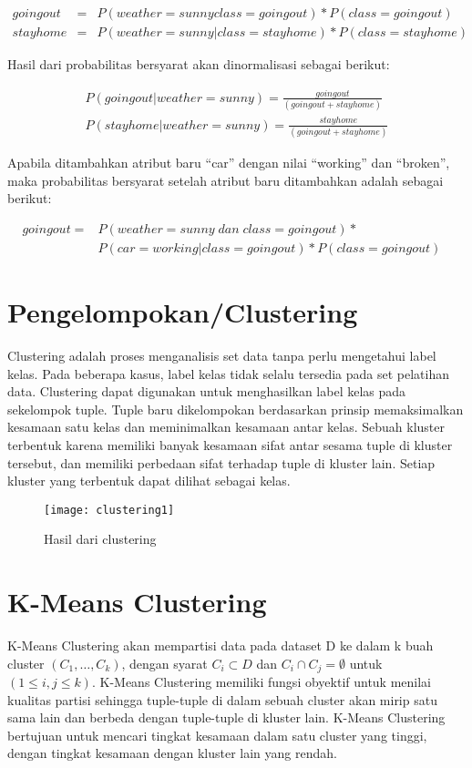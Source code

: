 \begin{enumerate}
\begin{eqnarray*}
goingout &=& P(weather=sunny class=goingout)*P(class=goingout)\\
stayhome &=& P(weather=sunny|class=stayhome)*P(class=stayhome)
\end{eqnarray*}

\noindent Hasil dari probabilitas bersyarat akan dinormalisasi sebagai berikut:

\begin{eqnarray*}
P(goingout|weather=sunny) = \frac{goingout}{(goingout+stayhome)} \\
P(stayhome|weather=sunny) = \frac{stayhome}{(goingout+stayhome)}
\end{eqnarray*}

\noindent Apabila ditambahkan atribut baru “car” dengan nilai “working” dan “broken”, maka probabilitas bersyarat setelah atribut baru ditambahkan adalah sebagai berikut: 

\begin{eqnarray*}
goingout = &P(weather=sunny \; dan \; class=goingout)*&\\
&P(car=working|class=goingout)*P(class=goingout)&
\end{eqnarray*}

\end{enumerate}

\newpage
\section{Pengelompokan/Clustering} 
Clustering adalah proses menganalisis set data tanpa perlu mengetahui label kelas. Pada beberapa kasus, label kelas tidak selalu tersedia pada set pelatihan data. Clustering dapat digunakan untuk menghasilkan label kelas pada sekelompok tuple. Tuple baru dikelompokan berdasarkan prinsip memaksimalkan kesamaan satu kelas dan meminimalkan kesamaan antar kelas. Sebuah kluster terbentuk karena memiliki banyak kesamaan sifat antar sesama tuple di kluster tersebut, dan memiliki perbedaan sifat terhadap tuple di kluster lain. Setiap kluster yang terbentuk dapat dilihat sebagai kelas.

\begin{figure}[H]
	\centering
	\texttt{[image: clustering1]}
	\caption{Hasil dari clustering}
	\label{fig:rnaalgorithm}
\end{figure}

\section{K-Means Clustering} 
K-Means Clustering akan mempartisi data pada dataset D ke dalam k buah cluster 
$(C_1, \ldots, C_k)$, dengan syarat $C_i \subset D$ dan $C_i \cap C_j = \emptyset$ untuk $(1 \leq i, j \leq k)$.  K-Means Clustering memiliki fungsi obyektif untuk menilai kualitas partisi sehingga tuple-tuple di dalam sebuah cluster akan mirip satu sama lain dan berbeda dengan tuple-tuple di kluster lain. K-Means Clustering bertujuan untuk mencari tingkat kesamaan dalam satu cluster yang tinggi, dengan tingkat kesamaan dengan kluster lain yang rendah.

